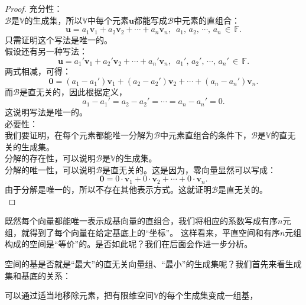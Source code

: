 \documentclass[12pt,UTF8,fontset=none]{ctexbook}
\begin{document}
\begin{proof} %
    充分性：\\
    $\mathcal{B}$是$\mathbb{V}$的生成集，所以$\mathbb{V}$中每个元素$\mathbf{u}$都能写成$\mathcal{B}$中元素的直组合：
    $$ \mathbf{u} = a_1\mathbf{v}_1 +a_2 \mathbf{v}_2 + \cdots + a_n\mathbf{v}_n, \,\,\, a_1,\,a_2,\,\cdots,\, a_n \,\in\,\mathbb{F}.$$
    只需证明这个写法是唯一的。\\
    假设还有另一种写法：
    $$ \mathbf{u} = a_1'\mathbf{v}_1 +a_2' \mathbf{v}_2 + \cdots + a_n'\mathbf{v}_n, \,\,\, a_1' ,\,a_2' ,\,\cdots,\, a_n' \,\in\,\mathbb{F}.$$
    两式相减，可得：
    $$ \mathbf{0} = (a_1 - a_1')\mathbf{v}_1 + (a_2 - a_2') \mathbf{v}_2 + \cdots + (a_n - a_n')\mathbf{v}_n.$$
    而$\mathcal{B}$是直无关的，因此根据定义，
    $$ a_1 - a_1' = a_2 - a_2' = \cdots = a_n - a_n' = 0.$$
    这说明写法是唯一的。\\
    必要性：\\
    我们要证明，在每个元素都能唯一分解为$\mathcal{B}$中元素直组合的条件下，$\mathcal{B}$是$\mathbb{V}$的直无关的生成集。\\
    分解的存在性，可以说明$\mathcal{B}$是$\mathbb{V}$的生成集。\\ 
    分解的唯一性，可以说明$\mathcal{B}$是直无关的。这是因为，零向量显然可以写成：
    $$ \mathbf{0} = 0\cdot\mathbf{v}_1 + 0\cdot\mathbf{v}_2 + \cdots + 0\cdot\mathbf{v}_n.$$
    由于分解是唯一的，所以不存在其他表示方式。这就证明$\mathcal{B}$是直无关的。\\
\end{proof}


既然每个向量都能唯一表示成基向量的直组合，我们将相应的系数写成有序$n$元组，就得到了每个向量在给定基底上的“坐标”。
这样看来，平直空间和有序$n$元组构成的空间是“等价”的。是否如此呢？我们在后面会作进一步分析。

空间的基是否就是“最大”的直无关向量组、“最小”的生成集呢？我们首先来看生成集和基底的关系：

\begin{pp}\label{pp:2_6}
    可以通过适当地移除元素，把有限维空间$\mathbb{V}$的每个生成集变成一组基，
\end{pp}
\end{document}
